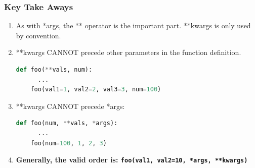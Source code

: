 \documentclass{beamer}
\begin{document}
%
%
\begin{frame}[fragile]
  \frametitle{Key Take Aways}
  \begin{enumerate}[A]
    \item As with *args, the ** operator is the important part. **kwargs is only used by convention.
      \pause
    \item **kwargs CANNOT precede other parameters in the function definition.
      \pause
      \begin{lstlisting}[language=Python, autogobble]
    def foo(**vals, num):
      ...
    foo(val1=1, val2=2, val3=3, num=100)
      \end{lstlisting}
      \vfill
      \pause
    \item **kwargs CANNOT precede *args:
      \begin{lstlisting}[language=Python, autogobble]
    def foo(num, **vals, *args):
      ...
    foo(num=100, 1, 2, 3)
      \end{lstlisting}
      \vfill
      \pause
    \item \textbf{Generally, the valid order is: \lstinline|foo(val1, val2=10, *args, **kwargs)|}
  \end{enumerate}
\end{frame}
\end{document}
